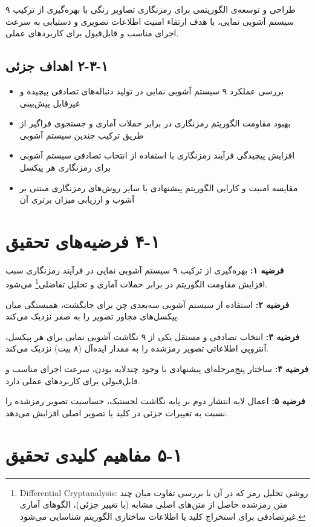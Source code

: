 طراحی و توسعه‌ی الگوریتمی برای رمزنگاری تصاویر رنگی با بهره‌گیری از ترکیب ۹ سیستم آشوبی نمایی، با هدف ارتقاء امنیت اطلاعات تصویری و دستیابی به سرعت اجرای مناسب و قابل‌قبول برای کاربردهای عملی.

\subsection{‏۱‏-‏۳‏-‏۲‏ اهداف جزئی}

\begin{itemize}
    \item بررسی عملکرد ۹ سیستم آشوبی نمایی در تولید دنباله‌های تصادفی پیچیده و غیرقابل پیش‌بینی
    \item بهبود مقاومت الگوریتم رمزنگاری در برابر حملات آماری و جستجوی فراگیر از طریق ترکیب چندین سیستم آشوبی
    \item افزایش پیچیدگی فرآیند رمزنگاری با استفاده از انتخاب تصادفی سیستم آشوبی برای رمزنگاری هر پیکسل
    \item مقایسه امنیت و کارایی الگوریتم پیشنهادی با سایر روش‌های رمزنگاری مبتنی بر آشوب و ارزیابی میزان برتری آن
\end{itemize}

\section{‏۱‏-‏۴‏ فرضیه‌های تحقیق}

\textbf{فرضیه ۱:} بهره‌گیری از ترکیب ۹ سیستم آشوبی نمایی در فرآیند رمزنگاری سبب افزایش مقاومت الگوریتم در برابر حملات آماری و تحلیل تفاضلی\footnote{Differential Cryptanalysis: روشی تحلیل رمز که در آن با بررسی تفاوت میان چند متن رمزشده حاصل از متن‌های اصلی مشابه (با تغییر جزئی)، الگوهای آماری غیرتصادفی برای استخراج کلید یا اطلاعات ساختاری الگوریتم شناسایی می‌شود.} می‌شود.

\textbf{فرضیه ۲:} استفاده از سیستم آشوبی سه‌بعدی چن برای جایگشت، همبستگی میان پیکسل‌های مجاور تصویر را به صفر نزدیک می‌کند.

\textbf{فرضیه ۳:} انتخاب تصادفی و مستقل یکی از ۹ نگاشت آشوبی نمایی برای هر پیکسل، آنتروپی اطلاعاتی تصویر رمزشده را به مقدار ایده‌آل (۸ بیت) نزدیک می‌کند.

\textbf{فرضیه ۴:} ساختار پنج‌مرحله‌ای پیشنهادی با وجود چندلایه بودن، سرعت اجرای مناسب و قابل‌قبولی برای کاربردهای عملی دارد.

\textbf{فرضیه ۵:} اعمال لایه انتشار دوم بر پایه نگاشت لجستیک، حساسیت تصویر رمزشده را نسبت به تغییرات جزئی در کلید یا تصویر اصلی افزایش می‌دهد.

\section{‏۱‏-‏۵‏ مفاهیم کلیدی تحقیق}

